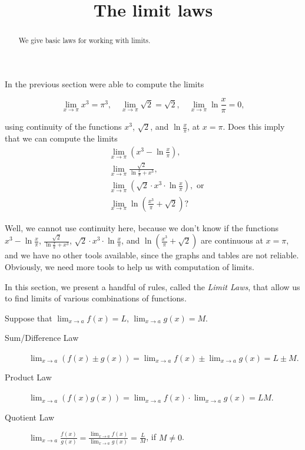 \documentclass{ximera}
\title[Dig-In:]{The limit laws}
\begin{document}
\begin{abstract}
We give basic laws for working with limits.
\end{abstract}
\maketitle
In the previous section were able to compute the limits

\[
\lim_{x\to \pi} x^3=\pi^3,\quad\lim_{x\to \pi} \sqrt{2}=\sqrt{2},\quad\lim_{x\to \pi} \ln{\frac{x}{\pi}}= 0,
\]

using continuity of the functions $x^3$, $\sqrt{2}$, and $\ln{\frac{x}{\pi}}$, at
$x=\pi$.  Does this imply that we can compute the limits
\begin{align*}
  &\lim_{x\to \pi} (x^3-\ln{\frac{x}{\pi}}),\\
  &\lim_{x\to \pi} \frac{\sqrt{2}}{\ln{\frac{x}{\pi}}+x^3},\\
  &\lim_{x\to \pi} (\sqrt{2}\cdot x^3\cdot\ln{\frac{x}{\pi}}), \text{ or}\\
  &\lim_{x\to \pi} \ln(\frac{x^3}{\pi}+\sqrt{2})?
\end{align*}

Well, we cannot use continuity here, because we don't know if the
functions $x^3-\ln{\frac{x}{\pi}}$, $\frac{\sqrt{2}}{\ln{\frac{x}{\pi}}+x^3}$, $\sqrt{2}\cdot
x^3\cdot\ln{\frac{x}{\pi}}$, and $\ln(\frac{x^3}{\pi}+\sqrt{2})$ are continuous at $x=\pi$, and we have no other tools available, since the graphs and tables are not reliable. Obviously, we need more tools to help us with computation of limits.

In this section, we present a handful of rules, called the \textit{Limit Laws}, that allow us to find limits of various combinations of functions.

\begin{theorem}\label{theorem:limit-laws}
Suppose that $\lim_{x\to a}f(x)=L$, $\lim_{x\to a}g(x)=M$.
\begin{description}
\item[Sum/Difference Law] $\lim_{x\to a} (f(x) \pm g(x)) =
  \lim_{x\to a}f(x) \pm \lim_{x\to a}g(x)=L \pm M$.
\item[Product Law]  $\lim_{x\to a} (f(x)g(x)) = \lim_{x\to
  a}f(x)\cdot\lim_{x\to a}g(x)=LM$.
\item[Quotient Law]  $\lim_{x\to a} \frac{f(x)}{g(x)} =
  \frac{\lim_{x\to a}f(x)}{\lim_{x\to a}g(x)}=\frac{L}{M}$, if
  $M\ne0$.
\end{description}
\label{thm:limit laws}
\end{theorem}
\end{document}

